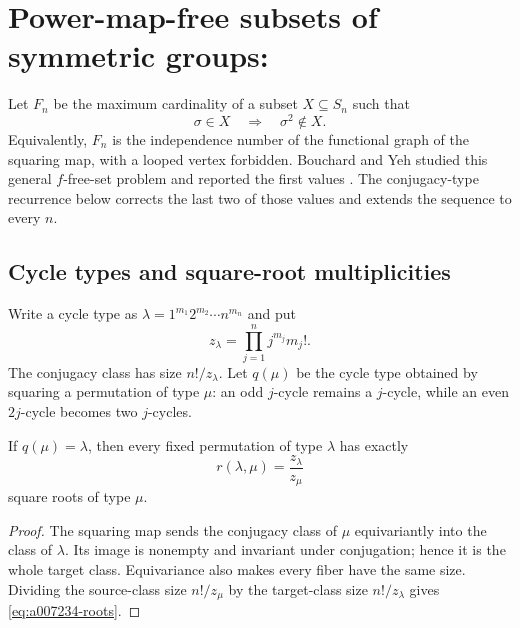 \section{Power-map-free subsets of symmetric groups: \texorpdfstring{}{A007234}}
\label{sec:a007234}

Let \(F_n\) be the maximum cardinality of a subset \(X\subseteq S_n\) such
that
\begin{equation}
 \sigma\in X\quad\Longrightarrow\quad \sigma^2\notin X.
 \label{eq:a007234-condition}
\end{equation}
Equivalently, \(F_n\) is the independence number of the functional graph of
the squaring map, with a looped vertex forbidden.  Bouchard and Yeh studied
this general \(f\)-free-set problem and reported the first values
\citep{BouchardYeh1992}.  The conjugacy-type recurrence below corrects the last
two of those values and extends the sequence to every \(n\).

\subsection{Cycle types and square-root multiplicities}

Write a cycle type as \(\lambda=1^{m_1}2^{m_2}\cdots n^{m_n}\) and put
\begin{equation}
 z_\lambda=\prod_{j=1}^{n}j^{m_j}m_j!.
 \label{eq:a007234-z}
\end{equation}
The conjugacy class has size \(n!/z_\lambda\).  Let \(q(\mu)\) be the cycle
type obtained by squaring a permutation of type \(\mu\): an odd \(j\)-cycle
remains a \(j\)-cycle, while an even \(2j\)-cycle becomes two \(j\)-cycles.

\begin{lemma}
\label{lem:a007234-roots}
If \(q(\mu)=\lambda\), then every fixed permutation of type \(\lambda\) has
exactly
\begin{equation}
 r(\lambda,\mu)=\frac{z_\lambda}{z_\mu}
 \label{eq:a007234-roots}
\end{equation}
square roots of type \(\mu\).
\end{lemma}

\begin{proof}
The squaring map sends the conjugacy class of \(\mu\) equivariantly into the
class of \(\lambda\).  Its image is nonempty and invariant under conjugation;
hence it is the whole target class.  Equivariance also makes every fiber have
the same size.  Dividing the source-class size \(n!/z_\mu\) by the target-class
size \(n!/z_\lambda\) gives \cref{eq:a007234-roots}.
\end{proof}

